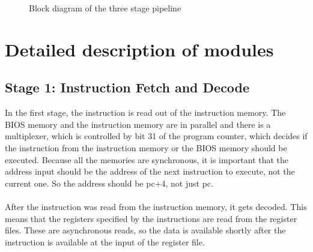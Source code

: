 \documentclass[12pt]{article}
\begin{document}
\begin{figure}[!hbtp]
\caption{Block diagram of the three stage pipeline}
\label{fig:block-diagram}
\end{figure}


\section{Detailed description of modules}
\subsection{Stage 1: Instruction Fetch and Decode}
In the first stage, the instruction is read out of the instruction memory. The BIOS memory and the instruction memory are in parallel and there is a multiplexer, which is controlled by bit 31 of the program counter, which decides if the instruction from the instruction memory or the BIOS memory should be executed. Because all the memories are synchronous, it is important that the address input should be the address of the next instruction to execute, not the current one. So the address should be pc+4, not just pc. \\\\
After the instruction was read from the instruction memory, it gets decoded. This means that the registers specified by the instructions are read from the register files. These are asynchronous reads, so the data is available shortly after the instruction is available at the input of the register file.
\end{document}
